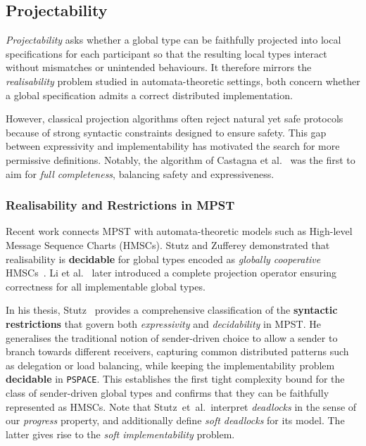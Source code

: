 \subsection{Projectability}
\emph{Projectability} asks whether a global type can be faithfully 
projected into local specifications for each participant so that the 
resulting local types interact without mismatches or unintended 
behaviours.  
It therefore mirrors the \emph{realisability} problem studied in 
automata-theoretic settings, both concern whether a global specification 
admits a correct distributed implementation.

However, classical projection algorithms often reject natural yet safe 
protocols because of strong syntactic constraints designed to ensure 
safety.  
This gap between expressivity and implementability has motivated the 
search for more permissive definitions.  
Notably, the algorithm of Castagna et al.~\cite{castagna2012global} 
was the first to aim for \emph{full completeness}, balancing safety 
and expressiveness.

\subsubsection{Realisability and Restrictions in MPST}
Recent work connects MPST with automata-theoretic models such as High-level 
Message Sequence Charts (HMSCs). Stutz and Zufferey demonstrated that 
realisability is \textbf{decidable} for global types encoded as 
\emph{globally cooperative} HMSCs~\cite{DBLP:journals/corr/abs-2209-10328,DBLP:conf/ecoop/Stutz23}.  
Li et al.~\cite{li2023complete} later introduced a complete projection operator 
ensuring correctness for all implementable global types.  

In his thesis, Stutz~\cite{stutz2024implementability} provides a comprehensive 
classification of the \textbf{syntactic restrictions} that govern both 
\emph{expressivity} and \emph{decidability} in MPST.  
He generalises the traditional notion of sender-driven choice to allow a sender 
to branch towards different receivers, capturing common distributed patterns 
such as delegation or load balancing, while keeping the implementability 
problem \textbf{decidable} in \verb|PSPACE|.  
This establishes the first tight complexity bound for the class of 
sender-driven global types and confirms that they can be faithfully 
represented as HMSCs.  
Note that Stutz~et~al.\ interpret \emph{deadlocks} in the sense of our
\emph{progress} property, and additionally define \emph{soft deadlocks}
for its model.
The latter gives rise to the \emph{soft implementability} problem.

